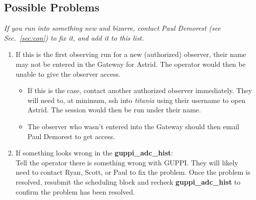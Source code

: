 \documentclass[11pt, reqno, tbtags]{article}
\begin{document}
\subsection{Possible Problems} %
\label{ssec:prob}
\textit{If you run into something new and bizarre, contact Paul Demorest (see Sec.~\ref{sec:con}) to fix it, and add it to this list.}
\begin{enumerate}
 \item If this is the first observing run for a new (authorized) observer, their name may not be entered in the Gateway for Astrid.  The operator would then be unable to give the observer access.  \begin{itemize}
  \item If this is the case, contact another authorized observer immediately.  They will need to, at minimum, ssh into \textit{titania} using their username to open Astrid.  The session would then be run under their name.  
  \item The observer who wasn't entered into the Gateway should then email Paul Demorest to get access.  
 \end{itemize}

 \item\label{st:gahp} If something looks wrong in the \textbf{guppi\_adc\_hist}: \\
 Tell the operator there is something wrong with GUPPI.  They will likely need to contact Ryan, Scott, or Paul to fix the problem.  Once the problem is resolved, resubmit the scheduling block and recheck \textbf{guppi\_adc\_hist} to confirm the problem has been resolved. 


\end{enumerate}
\end{document}
